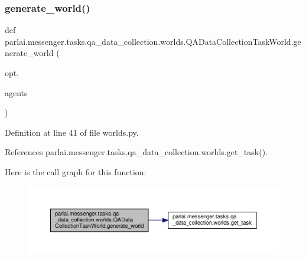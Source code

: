 \subsubsection{\texorpdfstring{generate\+\_\+world()}{generate\_world()}}
{\footnotesize\ttfamily def parlai.\+messenger.\+tasks.\+qa\+\_\+data\+\_\+collection.\+worlds.\+Q\+A\+Data\+Collection\+Task\+World.\+generate\+\_\+world (\begin{DoxyParamCaption}\item[{}]{opt,  }\item[{}]{agents }\end{DoxyParamCaption})\hspace{0.3cm}{\ttfamily [static]}}



Definition at line 41 of file worlds.\+py.



References parlai.\+messenger.\+tasks.\+qa\+\_\+data\+\_\+collection.\+worlds.\+get\+\_\+task().

Here is the call graph for this function\+:
\nopagebreak
\begin{figure}[H]
\begin{center}
\leavevmode
\includegraphics[width=350pt]{classparlai_1_1messenger_1_1tasks_1_1qa__data__collection_1_1worlds_1_1QADataCollectionTaskWorld_a5d78edfdf7dc7ccf8480f778c2d02c77_cgraph}
\end{center}
\end{figure}
\mbox{\label{classparlai_1_1messenger_1_1tasks_1_1qa__data__collection_1_1worlds_1_1QADataCollectionTaskWorld_ab93f22d24834dc304c101bdf67944189}} 
